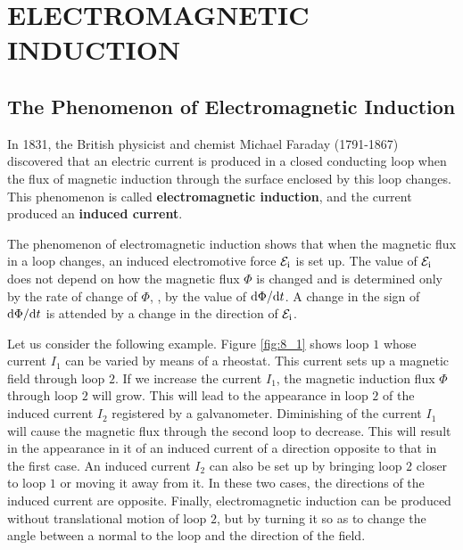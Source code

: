 

\chapter[ELECTROMAGNETIC INDUCTION]{ELECTROMAGNETIC\\ INDUCTION}\label{chap:8}

\section{The Phenomenon of Electromagnetic Induction}\label{sec:8_1}

In 1831, the British physicist and chemist Michael Faraday (1791-1867) discovered that an electric current is produced in a closed conducting loop when the flux of magnetic induction through the surface enclosed by this loop changes.
This phenomenon is called \textbf{electromagnetic induction}, and the current produced an \textbf{induced current}.

The phenomenon of electromagnetic induction shows that when the magnetic flux in a loop changes, an induced electromotive force $\mathcal{E}_{\text{i}}$ is set up.
The value of $\mathcal{E}_{\text{i}}$ does not depend on how the magnetic flux $\Phi$ is changed and is determined only by the rate of change of $\Phi$, \ie, by the value of $\mathrm{d}\Phi/\mathrm{d} t$.
A change in the sign of $\mathrm{d}\Phi/\mathrm{d} t$ is attended
by a change in the direction of $\mathcal{E}_{\text{i}}$.

Let us consider the following example.
Figure \ref{fig:8_1} shows loop $1$ whose current $I_1$ can be varied by means of a rheostat.
This current sets up a magnetic field through loop $2$.
If we increase the current $I_1$, the magnetic induction flux $\Phi$ through loop $2$ will grow.
This will lead to the appearance in loop $2$ of the induced current $I_2$ registered by a galvanometer.
Diminishing of the current $I_1$ will cause the magnetic flux through the second loop to decrease.
This will result in the appearance in it of an induced current of a direction opposite to that in the first case.
An induced current $I_2$ can also be set up by bringing loop $2$ closer to loop $1$ or moving it away from it.
In these two cases, the directions of the induced current are opposite.
Finally, electromagnetic induction can be produced without translational motion of loop $2$, but by turning it so as to change the angle between a normal to the loop and the direction of the field.

